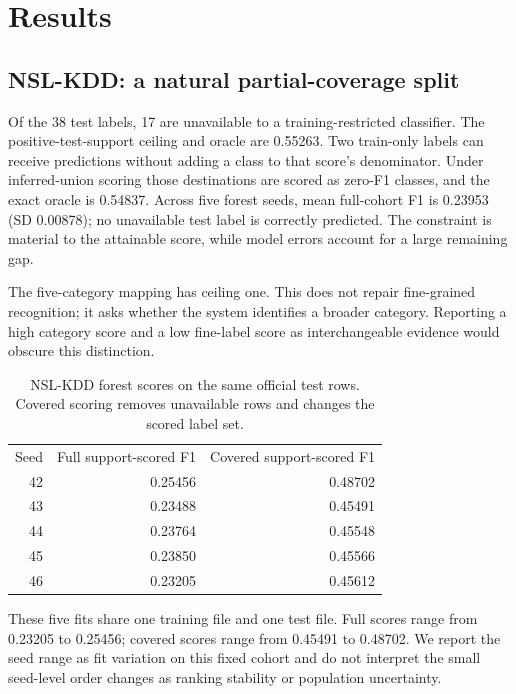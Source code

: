 \documentclass[namedate,webpdf,contemporary,large]{TBench-template}
\begin{document}
\section{Results}
\subsection{NSL-KDD: a natural partial-coverage split}
Of the 38 test labels, 17 are unavailable to a training-restricted classifier. The positive-test-support ceiling and oracle are 0.55263. Two train-only labels can receive predictions without adding a class to that score's denominator. Under inferred-union scoring those destinations are scored as zero-F1 classes, and the exact oracle is 0.54837. Across five forest seeds, mean full-cohort F1 is 0.23953 (SD 0.00878); no unavailable test label is correctly predicted. The constraint is material to the attainable score, while model errors account for a large remaining gap.

The five-category mapping has ceiling one. This does not repair fine-grained recognition; it asks whether the system identifies a broader category. Reporting a high category score and a low fine-label score as interchangeable evidence would obscure this distinction.

\begin{table}[h]\centering
\caption{NSL-KDD forest scores on the same official test rows. Covered scoring removes unavailable rows and changes the scored label set.}
\begin{tabular}{rrr}
Seed & Full support-scored F1 & Covered support-scored F1\\
42 & 0.25456 & 0.48702\\
43 & 0.23488 & 0.45491\\
44 & 0.23764 & 0.45548\\
45 & 0.23850 & 0.45566\\
46 & 0.23205 & 0.45612\\
\end{tabular}\end{table}
These five fits share one training file and one test file. Full scores range from 0.23205 to 0.25456; covered scores range from 0.45491 to 0.48702. We report the seed range as fit variation on this fixed cohort and do not interpret the small seed-level order changes as ranking stability or population uncertainty.
\end{document}
